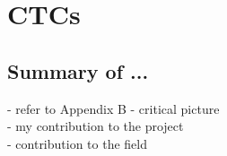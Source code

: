 \chapter{CTCs} \label{Chap:ctcs}


\section{Summary of ...} \label{sec:ctcssummary}

- refer to Appendix B
- critical picture\\
- my contribution to the project\\
- contribution to the field\\

%
